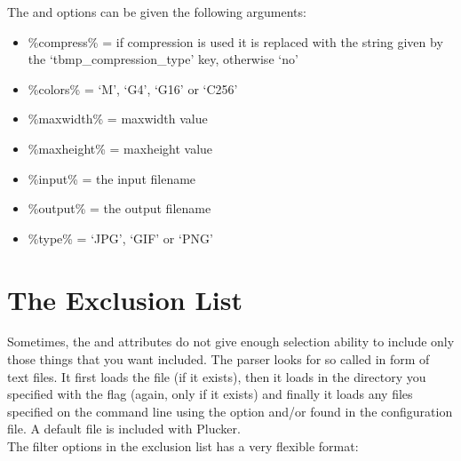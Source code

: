 The  and  options can be
given the following arguments:
\begin{itemize}
\item \%compress\%  = if compression is used it is replaced with the
string given by the `tbmp\_compression\_type' key, otherwise `no'
\item \%colors\%    = `M', `G4', `G16' or `C256'
\item \%maxwidth\%  = maxwidth value
\item \%maxheight\% = maxheight value
\item \%input\%     = the input filename
\item \%output\%    = the output filename
\item \%type\%      = `JPG', `GIF' or `PNG'
\end{itemize}

\section{The Exclusion List}\label{sec:Exclusionlist}

Sometimes, the  and
 attributes do not give enough
selection ability to include only those things that you want included.
The parser looks for so called  in form of text
files. It first loads the file 
(if it exists), then it loads  in the directory
you specified with the  flag (again, only if
it exists) and finally it loads any files specified on the command line
using the  option and/or found in the
configuration file. A default  file is included
with Plucker.\\

The filter options in the exclusion list has a very flexible format:\\

\begin{latexonly}
\end{latexonly}
\begin{htmlonly}
\end{htmlonly}\\

